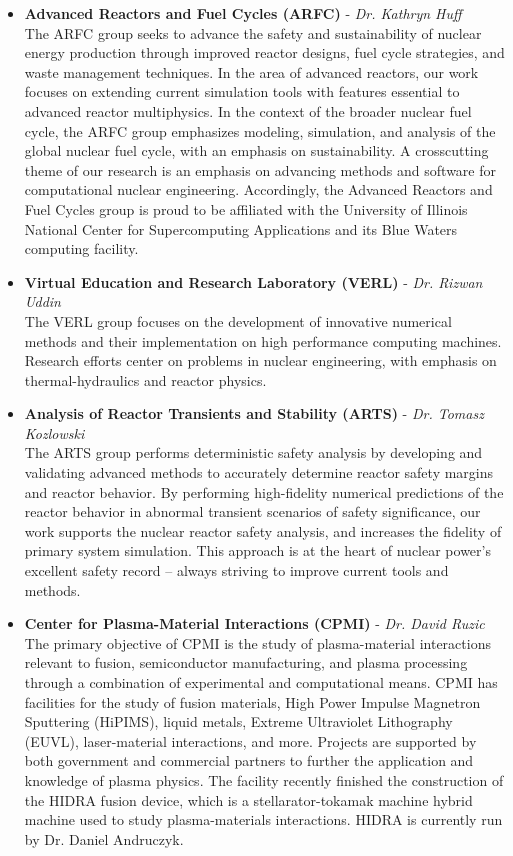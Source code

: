\begin{itemize}
  \item \textbf{Advanced Reactors and Fuel Cycles (ARFC)} - \textit{Dr. Kathryn Huff}\\
  The ARFC group seeks to advance the safety and sustainability of nuclear energy production through improved reactor designs, fuel cycle strategies, and waste management techniques. In the area of advanced reactors, our work focuses on extending current simulation tools with features essential to advanced reactor multiphysics. In the context of the broader nuclear fuel cycle, the ARFC group emphasizes modeling, simulation, and analysis of the global nuclear fuel cycle, with an emphasis on sustainability. A crosscutting theme of our research is an emphasis on advancing methods and software for computational nuclear engineering. Accordingly, the Advanced Reactors and Fuel Cycles group is proud to be affiliated with the University of Illinois National Center for Supercomputing Applications and its Blue Waters computing facility.
  \item \textbf{Virtual Education and Research Laboratory (VERL)} - \textit{Dr. Rizwan Uddin}\\
  The VERL group focuses on the development of innovative numerical methods and their implementation on high performance computing machines. Research efforts center on problems in nuclear engineering, with emphasis on thermal-hydraulics and reactor physics.

  \item \textbf{Analysis of Reactor Transients and Stability (ARTS)} - \textit{Dr. Tomasz Kozlowski}\\
  The ARTS group performs deterministic safety analysis by developing and validating advanced methods to accurately determine reactor safety margins and reactor behavior. By performing high-fidelity numerical predictions of the reactor behavior in abnormal transient scenarios of safety significance, our work supports the nuclear reactor safety analysis, and increases the fidelity of primary system simulation. This approach is at the heart of nuclear power’s excellent safety record – always striving to improve current tools and methods.

  \item \textbf{Center for Plasma-Material Interactions (CPMI)} - \textit{Dr. David Ruzic}\\
  The primary objective of CPMI is the study of plasma-material interactions relevant to fusion, semiconductor manufacturing, and plasma processing through a combination of experimental and computational means. CPMI has facilities for the study of fusion materials, High Power Impulse Magnetron Sputtering (HiPIMS), liquid metals, Extreme Ultraviolet Lithography (EUVL),  laser-material interactions, and more. Projects are supported by both government and commercial partners to further the application and knowledge of plasma physics. The facility recently finished the construction of the HIDRA fusion device, which is a stellarator-tokamak machine hybrid machine used to study plasma-materials interactions.  HIDRA is currently run by Dr. Daniel Andruczyk.


\end{itemize}
